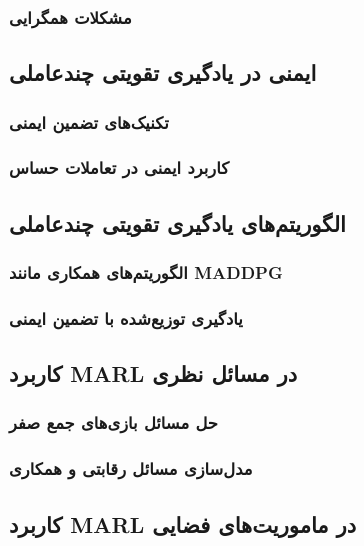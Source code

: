 \subsubsection{مشکلات همگرایی}

\subsection{ایمنی در یادگیری تقویتی چندعاملی}
\subsubsection{تکنیک‌های تضمین ایمنی}

\subsubsection{کاربرد ایمنی در تعاملات حساس}

\subsection{الگوریتم‌های یادگیری تقویتی چندعاملی}
\subsubsection{الگوریتم‌های همکاری مانند MADDPG}

\subsubsection{یادگیری توزیع‌شده با تضمین ایمنی}

\subsection{کاربرد MARL در مسائل نظری}
\subsubsection{حل مسائل بازی‌های جمع صفر}

\subsubsection{مدل‌سازی مسائل رقابتی و همکاری}

\subsection{کاربرد MARL در ماموریت‌های فضایی}

